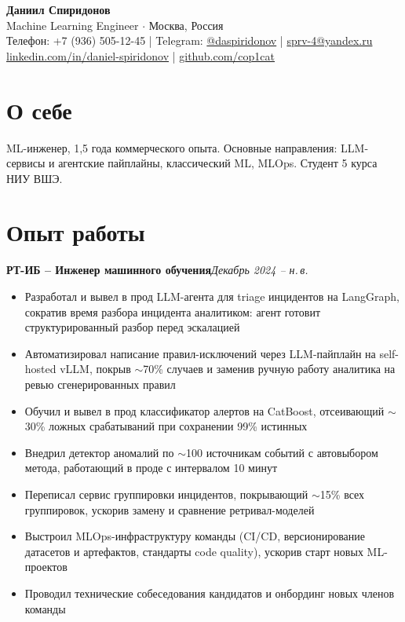 \documentclass[a4paper,11pt]{article}
\begin{document}
\pagestyle{empty}

\begin{center}
{\huge \textbf{Даниил Спиридонов}}\\[4pt]
Machine Learning Engineer $\cdot$ Москва, Россия\\[2pt]
Телефон: +7 (936) 505-12-45 | Telegram: \href{https://t.me/daspiridonov}{@daspiridonov} | \href{mailto:sprv-4@yandex.ru}{sprv-4@yandex.ru}\\
\href{https://www.linkedin.com/in/daniel-spiridonov/}{linkedin.com/in/daniel-spiridonov} | \href{https://github.com/cop1cat}{github.com/cop1cat}
\end{center}

\section*{О себе}
ML-инженер, 1,5 года коммерческого опыта. Основные направления: LLM-сервисы и агентские пайплайны, классический ML, MLOps. Студент 5 курса НИУ ВШЭ.

\section*{Опыт работы}
\textbf{РТ-ИБ -- Инженер машинного обучения}\hfill \textit{Декабрь 2024 -- н.\,в.}

\begin{itemize}
  \item Разработал и вывел в прод LLM-агента для triage инцидентов на LangGraph, сократив время разбора инцидента аналитиком: агент готовит структурированный разбор перед эскалацией
  \item Автоматизировал написание правил-исключений через LLM-пайплайн на self-hosted vLLM, покрыв \(\sim\)70\% случаев и заменив ручную работу аналитика на ревью сгенерированных правил
  \item Обучил и вывел в прод классификатор алертов на CatBoost, отсеивающий \(\sim\)30\% ложных срабатываний при сохранении 99\% истинных
  \item Внедрил детектор аномалий по \(\sim\)100 источникам событий с автовыбором метода, работающий в проде с интервалом 10 минут
  \item Переписал сервис группировки инцидентов, покрывающий \(\sim\)15\% всех группировок, ускорив замену и сравнение ретривал-моделей
  \item Выстроил MLOps-инфраструктуру команды (CI/CD, версионирование датасетов и артефактов, стандарты code quality), ускорив старт новых ML-проектов
  \item Проводил технические собеседования кандидатов и онбординг новых членов команды
\end{itemize}
\end{document}
